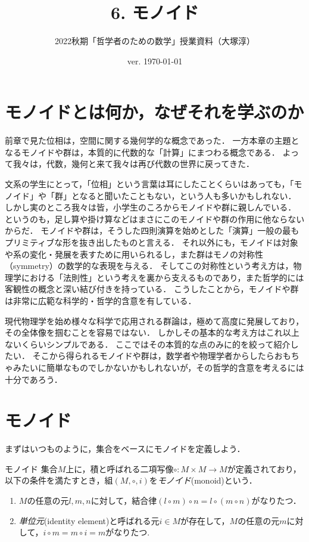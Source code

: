 \documentclass[11pt,a4paper, dvipdfmx]{jsarticle}
\begin{document}
\title{6. モノイド}
\author{2022秋期「哲学者のための数学」授業資料（大塚淳）}
\date{ver. \today}
\maketitle

\section{モノイドとは何か，なぜそれを学ぶのか}
前章で見た位相は，空間に関する幾何学的な概念であった．
一方本章の主題となるモノイドや群は，本質的に代数的な「計算」にまつわる概念である．
よって我々は，代数，幾何と来て我々は再び代数の世界に戻ってきた．

文系の学生にとって，「位相」という言葉は耳にしたことくらいはあっても，「モノイド」や「群」となると聞いたこともない，という人も多いかもしれない．
しかし実のところ我々は皆，小学生のころからモノイドや群に親しんでいる．
というのも，足し算や掛け算などはまさにこのモノイドや群の作用に他ならないからだ．
モノイドや群は，そうした四則演算を始めとした「演算」一般の最もプリミティブな形を抜き出したものと言える．
それ以外にも，モノイドは対象や系の変化・発展を表すために用いられるし，また群はモノの対称性（symmetry）の数学的な表現を与える．
そしてこの対称性という考え方は，物理学における「法則性」という考えを裏から支えるものであり，また哲学的には客観性の概念と深い結び付きを持っている．
こうしたことから，モノイドや群は非常に広範な科学的・哲学的含意を有している．

現代物理学を始め様々な科学で応用される群論は，極めて高度に発展しており，その全体像を掴むことを容易ではない．
しかしその基本的な考え方はこれ以上ないくらいシンプルである．
ここではその本質的な点のみに的を絞って紹介したい．
そこから得られるモノイドや群は，数学者や物理学者からしたらおもちゃみたいに簡単なものでしかないかもしれないが，その哲学的含意を考えるには十分であろう．

\section{モノイド}
まずはいつものように，集合をベースにモノイドを定義しよう．

\begin{dfn}{モノイド}
集合$M$上に，積と呼ばれる二項写像$\circ: M \times M \to M$が定義されており，以下の条件を満たすとき，組$(M, \circ, i)$を\emph{モノイド}(monoid)という．
\begin{enumerate}
 \item $M$の任意の元$l, m, n$に対して，結合律$(l \circ m) \circ n = l \circ (m \circ n)$がなりたつ．
 \item \emph{単位元}(identity element)と呼ばれる元$i \in M$が存在して，$M$の任意の元$m$に対して，$i \circ m = m \circ i = m$がなりたつ.
\end{enumerate} 
\end{dfn}
\end{document}
